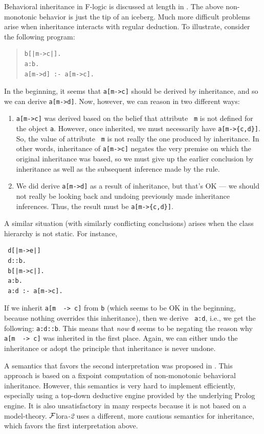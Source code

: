\documentclass[11pt]{article}
\newcommand{\FLSYSTEM}{{\mbox{\sc ${\cal F}${lora}\rm\emph{-2}}}\xspace}
\newcommand{\mvd}{{\mbox{\tt \,->\,}}}  %
\newcommand{\fl}{\mbox{F-logic}\xspace}
\begin{document}
Behavioral inheritance in \fl is discussed at length in
\cite{inheritance-odbase-02,kifer-yang-inheritance-2006}.  The above  non-monotonic behavior is
just the tip of an iceberg. Much more difficult problems arise when
inheritance interacts with regular deduction. To illustrate, consider
the following program:
\begin{quote}
\begin{verbatim}
b[|m->c|].
a:b.
a[m->d] :- a[m->c].
\end{verbatim}
\end{quote}
In the beginning, it seems that \verb|a[m->c]| should be derived by
inheritance, and so we can derive \verb|a[m->d]|. Now, however, we can
reason in two different ways:
\begin{enumerate}
\item \verb|a[m->c]| was derived based on the belief that attribute {\tt
    m} is not defined for the object {\tt a}. However, once inherited, we
  must necessarily have \verb|a[m->{c,d}]|. So, the value of attribute {\tt
    m} is not really the one produced by inheritance. In other words,
  inheritance of \verb|a[m->c]| negates the very premise on which the
  original inheritance was based, so we must give up the earlier conclusion
  by inheritance as well as the subsequent inference made by the rule.
\item We did derive \verb|a[m->d]| as a result of inheritance, but
  that's OK --- we should not really be looking back and undoing previously
  made inheritance inferences. Thus, the result must be \verb|a[m->{c,d}]|.
\end{enumerate}
A similar situation (with similarly conflicting conclusions) arises when
the class hierarchy is not static. For instance, 
\begin{verbatim}
 d[|m->e|]
 d::b.
 b[|m->c|].
 a:b.
 a:d :- a[m->c].  
\end{verbatim}
If we inherit {\tt a[m \mvd c]}  from {\tt b} (which seems to be OK in the
beginning, because nothing overrides this inheritance), then we derive {\tt
  a:d}, i.e., we get the following: {\tt a:d::b}. This means that
\emph{now} {\tt d} seems to be negating the reason why {\tt a[m \mvd c]} was
inherited in the first place. Again, we can either undo the inheritance or
adopt the principle that inheritance is never undone.

A semantics that favors the second interpretation was proposed in
\cite{KLW95}. This approach is based on a fixpoint computation of
non-monotonic behavioral inheritance.  However, this semantics is very hard
to implement efficiently, especially using a top-down deductive engine
provided by the underlying Prolog engine. It is also unsatisfactory in many
respects because it is not based on a model-theory. \FLSYSTEM uses a
different, more cautious semantics for inheritance, which favors the first
interpretation above.
\end{document}
